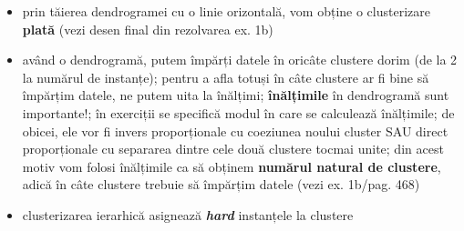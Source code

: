 \documentclass[12pt]{article}
\begin{document}
	\begin{itemize}
		\item prin tăierea dendrogramei cu o linie orizontală, vom obține o clusterizare \textbf{plată} (vezi desen final din rezolvarea ex. 1b)
		\item având o dendrogramă, putem împărți datele în oricâte clustere dorim (de la 2 la numărul de instanțe); pentru a afla totuși în câte clustere ar fi bine să împărțim datele, ne putem uita la înălțimi; \textbf{înălțimile} în dendrogramă sunt importante!; în exerciții se specifică modul în care se calculează înălțimile; de obicei, ele vor fi invers proporționale cu coeziunea noului cluster SAU direct proporționale cu separarea dintre cele două clustere tocmai unite; din acest motiv vom folosi înălțimile ca să obținem \textbf{numărul natural de clustere}, adică în câte clustere trebuie să împărțim datele (vezi ex. 1b/pag. 468) 
		\item clusterizarea ierarhică asignează \textbf{\textit{hard}} instanțele la clustere
	\end{itemize}
\end{document}
